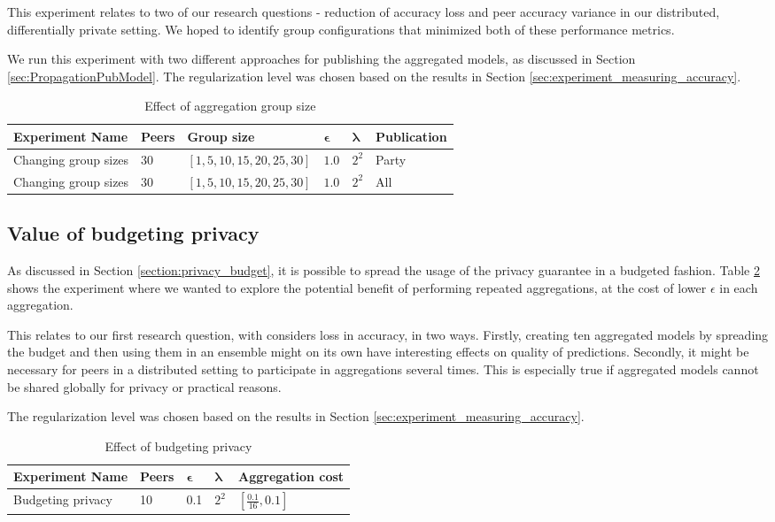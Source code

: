 This experiment relates to two of our research questions - reduction of accuracy loss and peer accuracy variance in our distributed, differentially private setting. We hoped to identify group configurations that minimized both of these performance metrics.

We run this experiment with two different approaches for publishing the aggregated models, as discussed in Section \ref{sec:PropagationPubModel}. The regularization level was chosen based on the results in Section \ref{sec:experiment_measuring_accuracy}.

\begin{table}[h]
	\centering
	\begin{tabular}{|l|l|l|l|l|l|}
		{\bf Experiment Name} & {\bf Peers} & {\bf Group size} & $\boldsymbol{\epsilon}$ & $\boldsymbol{\lambda}$ & {\bf Publication} \\
		\hline
		Changing group sizes  & 30          & $[1, 5, 10, 15, 20, 25, 30]$      &     $1.0$ & $2^{2}$ & Party     \\ 
		Changing group sizes  & 30          & $[1, 5, 10, 15, 20, 25, 30]$      &     $1.0$ & $2^{2}$ & All     \\ 
	\end{tabular}
	\caption{Effect of aggregation group size}
	\label{tab:experiments_group_sizes}
\end{table}


\subsection{Value of budgeting privacy}
 
As discussed in Section \ref{section:privacy_budget}, it is possible to spread the usage of the privacy guarantee in a budgeted fashion. Table \ref{tab:experiments_budgeting_privacy} shows the experiment where we wanted to explore the potential benefit of performing repeated aggregations, at the cost of lower $\epsilon$ in each aggregation. 

This relates to our first research question, with considers loss in accuracy, in two ways. Firstly, creating ten aggregated models by spreading the budget and then using them in an ensemble might on its own have interesting effects on quality of predictions. Secondly, it might be necessary for peers in a distributed setting to participate in aggregations several times. This is especially true if aggregated models cannot be shared globally for privacy or practical reasons.

The regularization level was chosen based on the results in Section \ref{sec:experiment_measuring_accuracy}.

\begin{table}[h]
	\centering	
	\begin{tabular}{|l|l|l|l|l|}
		{\bf Experiment Name} & {\bf Peers} & $\boldsymbol{\epsilon}$ & $\boldsymbol{\lambda}$ & {\bf Aggregation cost}        \\
		\hline
		Budgeting privacy & 10    & 0.1 &  $2^2$   & $[\frac{0.1}{16}, 0.1]$
	\end{tabular}
	\caption{Effect of budgeting privacy}
	\label{tab:experiments_budgeting_privacy}
\end{table}
